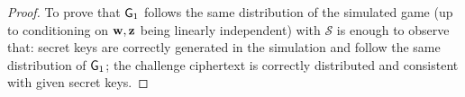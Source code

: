 \begin{proof}
	To prove that $\mathsf{G}_1$ follows the same distribution of the simulated game (up to conditioning on $\mathbf{w}, \mathbf{z}$ being linearly independent) with $\mathcal{S}$ is enough to observe that:
	secret keys are correctly generated in the simulation and follow the same distribution of $\mathsf{G}_1$;
	the challenge ciphertext is correctly distributed and consistent with given secret keys.
\end{proof}